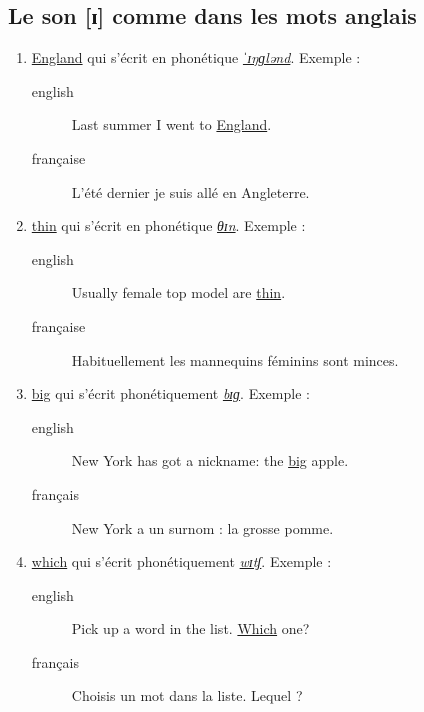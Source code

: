 \documentclass[12pt,a4paper]{book}
\begin{document}
\subsection{Le son [ɪ] comme dans les mots anglais}
\label{sec:orgf03eb34}
\begin{enumerate}
\item \href{http://www.wordreference.com/enfr/england}{England} qui s'écrit en phonétique \href{https://en.oxforddictionaries.com/definition/england}{\emph{ˈɪŋɡlənd}}. Exemple :
\begin{description}
\item[{english}] \textenglish{Last summer I went to \href{https://youtu.be/QUPBesOdax8}{England}.}
\item[{française}] L'été dernier je suis allé en Angleterre.
\end{description}
\item \href{http://www.wordreference.com/enfr/thin}{thin} qui s'écrit en phonétique \href{https://en.oxforddictionaries.com/definition/thin}{\emph{θɪn}}. Exemple :
\begin{description}
\item[{english}] \textenglish{Usually female top model are \href{https://youtu.be/LekA62H17bo}{thin}.}
\item[{française}] Habituellement les mannequins féminins sont minces.
\end{description}
\item \href{http://www.wordreference.com/enfr/big}{big} qui s'écrit phonétiquement \href{https://en.oxforddictionaries.com/definition/big}{\emph{bɪɡ}}. Exemple :
\begin{description}
\item[{english}] \textenglish{New York has got a nickname: the \href{https://youtu.be/Jha4OkG-ixw}{big} apple.}
\item[{français}] New York a un surnom : la grosse pomme.
\end{description}
\item \href{http://www.wordreference.com/enfr/which}{which} qui s'écrit phonétiquement \href{https://en.oxforddictionaries.com/definition/which}{\emph{wɪtʃ}}. Exemple :
\begin{description}
\item[{english}] \textenglish{Pick up a word in the list. \href{https://youtu.be/5fR\_\_LXDkRg}{Which} one?}
\item[{français}] Choisis un mot dans la liste. Lequel ?
\end{description}
\end{enumerate}
\end{document}
